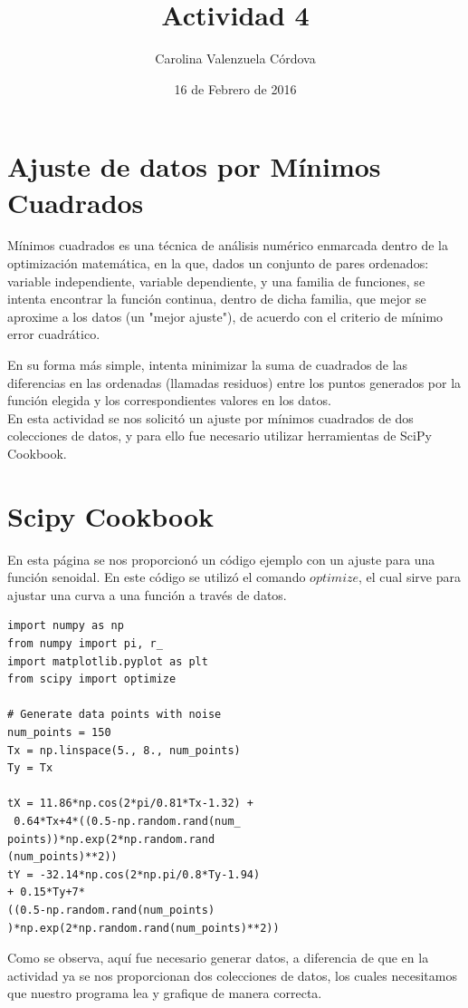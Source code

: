 \documentclass[12 pt,twocolumn]{article}
\begin{document}
	\title{Actividad 4}
	\author{Carolina Valenzuela Córdova}
	\date{16 de Febrero de 2016}
	\maketitle
	\newpage
	
	\section{\small Ajuste de datos por Mínimos Cuadrados}
Mínimos cuadrados es una técnica de análisis numérico enmarcada dentro de la optimización matemática, en la que, dados un conjunto de pares ordenados: variable independiente, variable dependiente, y una familia de funciones, se intenta encontrar la función continua, dentro de dicha familia, que mejor se aproxime a los datos (un "mejor ajuste"), de acuerdo con el criterio de mínimo error cuadrático.

En su forma más simple, intenta minimizar la suma de cuadrados de las diferencias en las ordenadas (llamadas residuos) entre los puntos generados por la función elegida y los correspondientes valores en los datos.\cite{w}\\
En esta actividad se nos solicitó un ajuste por mínimos cuadrados de dos colecciones de datos, y para ello fue necesario utilizar herramientas de SciPy Cookbook.

\section{\small Scipy Cookbook}
En esta página se nos proporcionó un código ejemplo con un ajuste para una función senoidal. En este código se utilizó el comando $optimize$, el cual sirve para ajustar una curva a una función a través de datos. 
\begin{verbatim}
import numpy as np
from numpy import pi, r_
import matplotlib.pyplot as plt
from scipy import optimize

# Generate data points with noise
num_points = 150
Tx = np.linspace(5., 8., num_points)
Ty = Tx

tX = 11.86*np.cos(2*pi/0.81*Tx-1.32) +
 0.64*Tx+4*((0.5-np.random.rand(num_
points))*np.exp(2*np.random.rand
(num_points)**2))
tY = -32.14*np.cos(2*np.pi/0.8*Ty-1.94) 
+ 0.15*Ty+7*
((0.5-np.random.rand(num_points)
)*np.exp(2*np.random.rand(num_points)**2))
\end{verbatim}
Como se observa, aquí fue necesario generar datos, a diferencia de que en la actividad ya se nos proporcionan dos colecciones de datos, los cuales necesitamos que nuestro programa lea y grafique de manera correcta.
\end{document}
